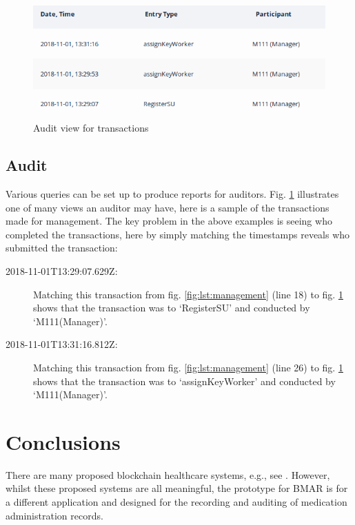 \documentclass[runningheads]{llncs}
\begin{document}
\begin{figure}
	\centering
	\includegraphics[scale=.50]{audit2.png}
	\caption{Audit view for transactions}
	\label{fig:audit}
\end{figure}

\subsection{Audit}
Various queries can be set up to produce reports for auditors. Fig. \ref{fig:audit} illustrates one of many views an auditor may have, here is a sample of the transactions made for management. The key problem in the above examples is seeing who completed the transactions, here by simply matching the timestamps reveals who submitted the transaction:
\begin{description}
	\item[2018-11-01T13:29:07.629Z:] Matching this transaction from fig. \ref{fig:lst:management} (line 18) to fig. \ref{fig:audit} shows that the transaction was to `RegisterSU' and conducted by `M111(Manager)'.
	\item[2018-11-01T13:31:16.812Z:] Matching this transaction from fig. \ref{fig:lst:management} (line 26) to fig. \ref{fig:audit} shows that the transaction was to `assignKeyWorker' and conducted by `M111(Manager)'.
\end{description}



\section{Conclusions}
\label{sec:conclusions}

There are many proposed blockchain healthcare systems, e.g., see \cite{zhang2017applying,griggs2018healthcare,azaria2016medrec,vithanwattana2017developing}. However, whilst these proposed systems are all meaningful, the prototype for BMAR is for a different application and designed for the recording and auditing of medication administration records. 
\end{document}
